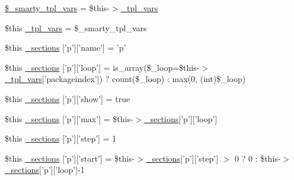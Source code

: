 \begin{DoxyCompactItemize}
\item 
\hyperlink{_06_06131_05_06_06131447552_05elementindex_8tpl_8php_a14dde6d029d65a879ee7bc1ebc398dd1}{\$\-\_\-smarty\-\_\-tpl\-\_\-vars} = \$this-\/$>$\hyperlink{_06_06127_05_06_0612781687_05pkgelementindex_8tpl_8php_a4a4846d8e68d455590131a05697f67a3}{\-\_\-tpl\-\_\-vars}
\item 
\$this \hyperlink{_06_06131_05_06_06131447552_05elementindex_8tpl_8php_a4a4846d8e68d455590131a05697f67a3}{\-\_\-tpl\-\_\-vars} = \$\-\_\-smarty\-\_\-tpl\-\_\-vars
\item 
\$this \hyperlink{_06_06131_05_06_06131447552_05elementindex_8tpl_8php_ac23b0b1d4f3c081e87a726b494bf863e}{\-\_\-sections} \mbox{[}'p'\mbox{]}\mbox{[}'name'\mbox{]} = 'p'
\item 
\$this \hyperlink{_06_06131_05_06_06131447552_05elementindex_8tpl_8php_acf112e73369b5d57a5dd5027c069ef61}{\-\_\-sections} \mbox{[}'p'\mbox{]}\mbox{[}'loop'\mbox{]} = is\-\_\-array(\$\-\_\-loop=\$this-\/$>$\hyperlink{_06_06127_05_06_0612781687_05pkgelementindex_8tpl_8php_a4a4846d8e68d455590131a05697f67a3}{\-\_\-tpl\-\_\-vars}\mbox{[}'packageindex'\mbox{]}) ? count(\$\-\_\-loop) \-: max(0, (int)\$\-\_\-loop)
\item 
\$this \hyperlink{_06_06131_05_06_06131447552_05elementindex_8tpl_8php_a59f101f9fd9747a4a1221916ee363795}{\-\_\-sections} \mbox{[}'p'\mbox{]}\mbox{[}'show'\mbox{]} = true
\item 
\$this \hyperlink{_06_06131_05_06_06131447552_05elementindex_8tpl_8php_ab9459d9765bffe6e71f98da075f4db9c}{\-\_\-sections} \mbox{[}'p'\mbox{]}\mbox{[}'max'\mbox{]} = \$this-\/$>$\hyperlink{_06_06127_05_06_0612781687_05pkgelementindex_8tpl_8php_a9e3d26b39edfe29c3f29b8035ef33828}{\-\_\-sections}\mbox{[}'p'\mbox{]}\mbox{[}'loop'\mbox{]}
\item 
\$this \hyperlink{_06_06131_05_06_06131447552_05elementindex_8tpl_8php_af0fe94b17f05601e226e298e84c30948}{\-\_\-sections} \mbox{[}'p'\mbox{]}\mbox{[}'step'\mbox{]} = 1
\item 
\$this \hyperlink{_06_06131_05_06_06131447552_05elementindex_8tpl_8php_a6fedf9177032a51c081909aa685397f0}{\-\_\-sections} \mbox{[}'p'\mbox{]}\mbox{[}'start'\mbox{]} = \$this-\/$>$\hyperlink{_06_06127_05_06_0612781687_05pkgelementindex_8tpl_8php_a9e3d26b39edfe29c3f29b8035ef33828}{\-\_\-sections}\mbox{[}'p'\mbox{]}\mbox{[}'step'\mbox{]} $>$ 0 ? 0 \-: \$this-\/$>$\hyperlink{_06_06127_05_06_0612781687_05pkgelementindex_8tpl_8php_a9e3d26b39edfe29c3f29b8035ef33828}{\-\_\-sections}\mbox{[}'p'\mbox{]}\mbox{[}'loop'\mbox{]}-\/1

\end{DoxyCompactItemize}
